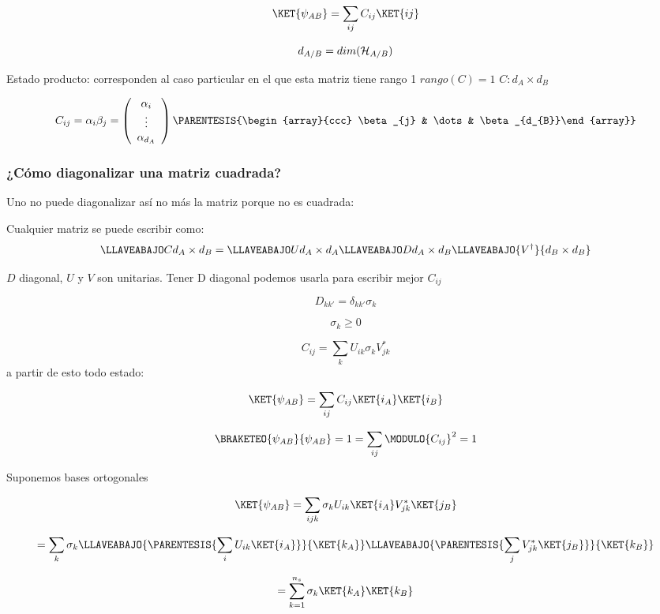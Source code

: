 \[
\KET{\psi_{AB}}=\sum_{ij}C_{ij}\KET{ij}
\]

\[
d_{A/B}=dim(\text{\ensuremath{\mathcal{H}}}_{A/B})
\]

Estado producto: corresponden al caso particular en el que esta matriz
tiene rango 1 $rango(C)=1$ $C:d_{A}\times d_{B}$

\[
C_{ij}=\alpha_{i}\beta_{j}=\left(\begin{array}{c}
\alpha_{i}\\
\vdots\\
\alpha_{d_{A}}
\end{array}\right)\PARENTESIS{\begin{array}{ccc}
\beta_{j} & \dots & \beta_{d_{B}}\end{array}}
\]


\subsubsection{¿Cómo diagonalizar una matriz cuadrada?}

Uno no puede diagonalizar así no más la matriz porque no es cuadrada:

Cualquier matriz se puede escribir como: 
\begin{equation}
\LLAVEABAJO C{d_{A}\times d_{B}}=\LLAVEABAJO U{d_{A}\times d_{A}}\LLAVEABAJO D{d_{A}\times d_{B}}\LLAVEABAJO{V^{\dagger}}{d_{B}\times d_{B}}\label{eq:Cij}
\end{equation}

$D$ diagonal, $U$ y $V$ son unitarias. Tener D diagonal podemos
usarla para escribir mejor $C_{ij}$

\[
D_{kk'}=\delta_{kk'}\sigma_{k}
\]

\[
\sigma_{k}\geq0
\]

\[
C_{ij}=\sum_{k}U_{ik}\sigma_{k}V_{jk}^{*}
\]
a partir de esto todo estado:

\[
\KET{\psi_{AB}}=\sum_{ij}C_{ij}\KET{i_{A}}\KET{i_{B}}
\]

\[
\BRAKETEO{\psi_{AB}}{\psi_{AB}}=1=\sum_{ij}\MODULO{C_{ij}}^{2}=1
\]

Suponemos bases ortogonales

\[
\KET{\psi_{AB}}=\sum_{ijk}\sigma_{k}U_{ik}\KET{i_{A}}V_{jk}^{*}\KET{j_{B}}
\]

\[
=\sum_{k}\sigma_{k}\LLAVEABAJO{\PARENTESIS{\sum_{i}U_{ik}\KET{i_{A}}}}{\KET{k_{A}}}\LLAVEABAJO{\PARENTESIS{\sum_{j}V_{jk}^{*}\KET{j_{B}}}}{\KET{k_{B}}}
\]

\[
=\sum_{k=1}^{n_{s}}\sigma_{k}\KET{k_{A}}\KET{k_{B}}
\]


